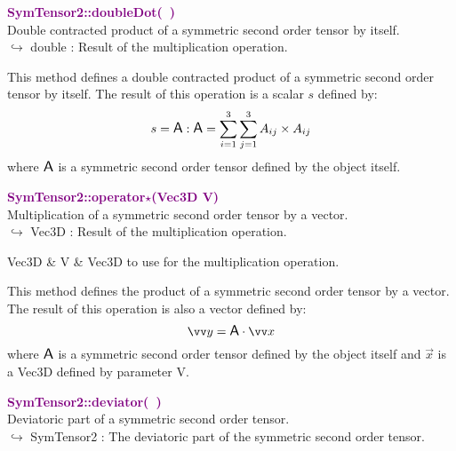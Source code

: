 \textcolor{purple}{\textbf{SymTensor2::doubleDot(~)}}\label{SymTensor2::doubleDot()}\\
Double contracted product of a symmetric second order tensor by itself.\\ \hspace*{10mm}$\hookrightarrow$ double : Result of the multiplication operation.

This method defines a double contracted product of a symmetric second order tensor by itself.
The result of this operation is a scalar $s$ defined by:
\begin{equation*}
s = \mbox{\large\ensuremath{\mathsf{A}}} : \mbox{\large\ensuremath{\mathsf{A}}} = \sum_{i=1}^{3} \sum_{j=1}^{3} A_{ij}\times A_{ij}
\end{equation*}
where $\mbox{\large\ensuremath{\mathsf{A}}}$ is a symmetric second order tensor defined by the object itself.

\textcolor{purple}{\textbf{SymTensor2::operator$\star$(Vec3D V)}}\label{SymTensor2::operator*(Vec3D V)}\\
Multiplication of a symmetric second order tensor by a vector.\\ \hspace*{10mm}$\hookrightarrow$ Vec3D : Result of the multiplication operation.

\begin{tcolorbox}[width=\textwidth,myArgs,tabularx={ll|R}]
Vec3D & V & Vec3D to use for the multiplication operation.
\end{tcolorbox}

This method defines the product of a symmetric second order tensor by a vector.
The result of this operation is also a vector defined by:
\begin{equation*}
\overrightarrow{y} = \A \cdot \overrightarrow{x}
\end{equation*}
where $\mbox{\large\ensuremath{\mathsf{A}}}$ is a symmetric second order tensor defined by the object itself and $\overrightarrow{x}$ is a Vec3D defined by parameter V.

\textcolor{purple}{\textbf{SymTensor2::deviator(~)}}\label{SymTensor2::deviator()}\\
Deviatoric part of a symmetric second order tensor.\\ \hspace*{10mm}$\hookrightarrow$ SymTensor2 : The deviatoric part of the symmetric second order tensor.

